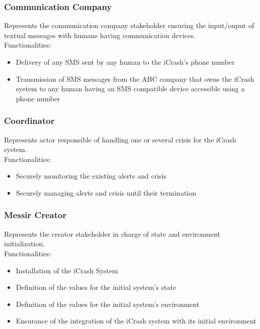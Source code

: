 \subsubsection{Communication Company}
Represents the communication company stakeholder ensuring the input/ouput of
textual messages with humans having communication devices.\\
Functionalities:
\begin{itemize}
  \item Delivery of any SMS sent by any human to the iCrash's phone number
  \item Transmission of SMS messages from the ABC company that owns the iCrash
  system to any human having an SMS compatible device accessible using a phone
  number
\end{itemize}

\subsubsection{Coordinator}
Represents actor responsible of handling one or several crisis for the iCrash
system.\\
Functionalities:
\begin{itemize}
  \item Securely monitoring the existing alerts and crisis
  \item Securely managing alerts and crisis until their termination
\end{itemize}

\subsubsection{Messir Creator}
Represents the creator stakeholder in charge of state and environment
initialization.\\
Functionalities:
\begin{itemize}
  \item Installation of the iCrash System
  \item Definition of the values for the initial system’s state
  \item Definition of the values for the initial system’s environment
  \item Ensurance of  the integration of the iCrash system with its initial
  environment
\end{itemize}

